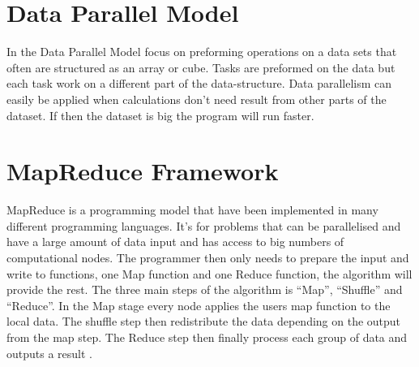 \section{Data Parallel Model}
In the Data Parallel Model focus on preforming operations on a data sets that often are structured as an array or cube. Tasks are preformed on the data but each task work on a different part of the data-structure. Data parallelism can easily be applied when calculations don’t need result from other parts of the dataset. If then the dataset is big the program will run faster. 


\section{MapReduce Framework}
MapReduce is a programming model that have been implemented in many different programming languages. It’s for problems that can be parallelised and have a large amount of data input and has access to big numbers of computational nodes. The programmer then only needs to prepare the input and write to functions, one Map function and one Reduce function, the algorithm will provide the rest. The three main steps of the algorithm is “Map”, “Shuffle” and “Reduce”. In the Map stage every node applies the users map function to the local data. The shuffle step then redistribute the data depending on the output from the map step. The Reduce step then finally process each group of data and outputs a result \citep{mapreduce}.
